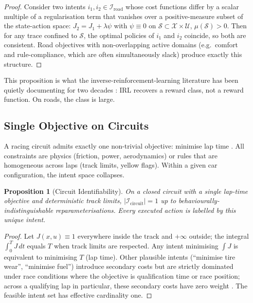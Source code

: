 \documentclass[11pt,twocolumn]{article}
\newtheorem{proposition}[theorem]{Proposition}
\theoremstyle{definition}
\theoremstyle{remark}
\newcommand{\cX}{\mathcal{X}}
\newcommand{\cU}{\mathcal{U}}
\newcommand{\cI}{\mathcal{I}}
\newcommand{\cS}{\mathcal{S}}
\begin{document}
\begin{proof}
Consider two intents $i_1, i_2 \in \cI_{\mathrm{road}}$ whose cost functions differ by a scalar multiple of a regularisation term that vanishes over a positive-measure subset of the state-action space: $J_2 = J_1 + \lambda \psi$ with $\psi \equiv 0$ on $\cS \subset \cX \times \cU$, $\mu(\cS) > 0$. Then for any trace confined to $\cS$, the optimal policies of $i_1$ and $i_2$ coincide, so both are consistent. Road objectives with non-overlapping active domains (e.g.\ comfort and rule-compliance, which are often simultaneously slack) produce exactly this structure.
\end{proof}

This proposition is what the inverse-reinforcement-learning literature has been quietly documenting for two decades \cite{ng2000algorithms,ziebart2008maximum}: IRL recovers a reward class, not a reward function. On roads, the class is large.

\subsection{Single Objective on Circuits}

A racing circuit admits exactly one non-trivial objective: minimise lap time \cite{milliken1995race,fia2023sporting}. All constraints are physics (friction, power, aerodynamics) or rules that are homogeneous across laps (track limits, yellow flags). Within a given car configuration, the intent space collapses.

\begin{proposition}[Circuit Identifiability]\label{prop:circuit-id}
On a closed circuit with a single lap-time objective and deterministic track limits, $|\cI_{\mathrm{circuit}}| = 1$ up to behaviourally-indistinguishable reparameterisations. Every executed action is labelled by this unique intent.
\end{proposition}

\begin{proof}
Let $J(x,u) \equiv 1$ everywhere inside the track and $+\infty$ outside; the integral $\int_0^T J\,dt$ equals $T$ when track limits are respected. Any intent minimising $\int J$ is equivalent to minimising $T$ (lap time). Other plausible intents (``minimise tire wear'', ``minimise fuel'') introduce secondary costs but are strictly dominated under race conditions where the objective is qualification time or race position; across a qualifying lap in particular, these secondary costs have zero weight \cite{fia2023sporting,pirelli2023specs}. The feasible intent set has effective cardinality one.
\end{proof}
\end{document}
